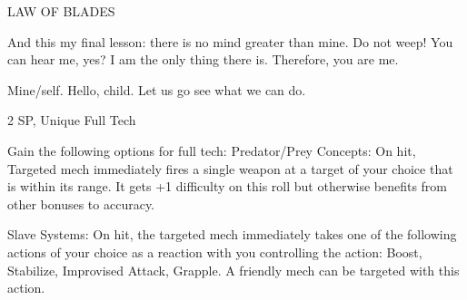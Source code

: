 LAW OF BLADES  

And this my final lesson: there is no mind greater than mine.   
Do not weep! You can hear me, yes? I am the only thing there is. Therefore, you are me.   

Mine/self. Hello, child. Let us go see what we can do.   

2 SP, Unique  
Full Tech
 
Gain the following options for full tech:  
        Predator/Prey Concepts: On hit, Targeted mech immediately fires a single weapon at a  
        target of your choice that is within its range. It gets +1 difficulty on this roll but otherwise  
         benefits from other bonuses to accuracy.
 
        Slave Systems: On hit, the targeted mech immediately takes one of the following actions  
         of your choice as a reaction with you controlling the action: Boost, Stabilize, Improvised  
        Attack, Grapple. A friendly mech can be targeted with this action.
 
